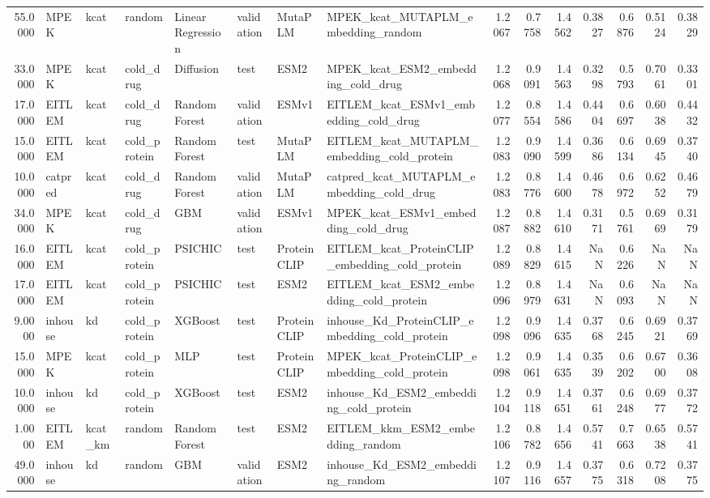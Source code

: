 \begin{tabular}{rlllllllrrrrrrr}
55.0000 & MPEK & kcat & random & Linear Regression & validation & MutaPLM & MPEK_kcat_MUTAPLM_embedding_random & 1.2067 & 0.7758 & 1.4562 & 0.3827 & 0.6876 & 0.5124 & 0.3829 \\
33.0000 & MPEK & kcat & cold_drug & Diffusion & test & ESM2 & MPEK_kcat_ESM2_embedding_cold_drug & 1.2068 & 0.9091 & 1.4563 & 0.3298 & 0.5793 & 0.7061 & 0.3301 \\
17.0000 & EITLEM & kcat & cold_drug & Random Forest & validation & ESMv1 & EITLEM_kcat_ESMv1_embedding_cold_drug & 1.2077 & 0.8554 & 1.4586 & 0.4404 & 0.6697 & 0.6038 & 0.4432 \\
15.0000 & EITLEM & kcat & cold_protein & Random Forest & test & MutaPLM & EITLEM_kcat_MUTAPLM_embedding_cold_protein & 1.2083 & 0.9090 & 1.4599 & 0.3686 & 0.6134 & 0.6945 & 0.3740 \\
10.0000 & catpred & kcat & cold_drug & Random Forest & validation & MutaPLM & catpred_kcat_MUTAPLM_embedding_cold_drug & 1.2083 & 0.8776 & 1.4600 & 0.4678 & 0.6972 & 0.6252 & 0.4679 \\
34.0000 & MPEK & kcat & cold_drug & GBM & validation & ESMv1 & MPEK_kcat_ESMv1_embedding_cold_drug & 1.2087 & 0.8882 & 1.4610 & 0.3171 & 0.5761 & 0.6969 & 0.3179 \\
16.0000 & EITLEM & kcat & cold_protein & PSICHIC & test & ProteinCLIP & EITLEM_kcat_ProteinCLIP_embedding_cold_protein & 1.2089 & 0.8829 & 1.4615 & NaN & 0.6226 & NaN & NaN \\
17.0000 & EITLEM & kcat & cold_protein & PSICHIC & test & ESM2 & EITLEM_kcat_ESM2_embedding_cold_protein & 1.2096 & 0.8979 & 1.4631 & NaN & 0.6093 & NaN & NaN \\
9.0000 & inhouse & kd & cold_protein & XGBoost & test & ProteinCLIP & inhouse_Kd_ProteinCLIP_embedding_cold_protein & 1.2098 & 0.9096 & 1.4635 & 0.3768 & 0.6245 & 0.6921 & 0.3769 \\
15.0000 & MPEK & kcat & cold_protein & MLP & test & ProteinCLIP & MPEK_kcat_ProteinCLIP_embedding_cold_protein & 1.2098 & 0.9061 & 1.4635 & 0.3539 & 0.6202 & 0.6700 & 0.3608 \\
10.0000 & inhouse & kd & cold_protein & XGBoost & test & ESM2 & inhouse_Kd_ESM2_embedding_cold_protein & 1.2104 & 0.9118 & 1.4651 & 0.3761 & 0.6248 & 0.6977 & 0.3772 \\
1.0000 & EITLEM & kcat_km & random & Random Forest & test & ESM2 & EITLEM_kkm_ESM2_embedding_random & 1.2106 & 0.8782 & 1.4656 & 0.5741 & 0.7663 & 0.6538 & 0.5741 \\
49.0000 & inhouse & kd & random & GBM & validation & ESM2 & inhouse_Kd_ESM2_embedding_random & 1.2107 & 0.9116 & 1.4657 & 0.3775 & 0.6318 & 0.7208 & 0.3775 \\

\end{tabular}

